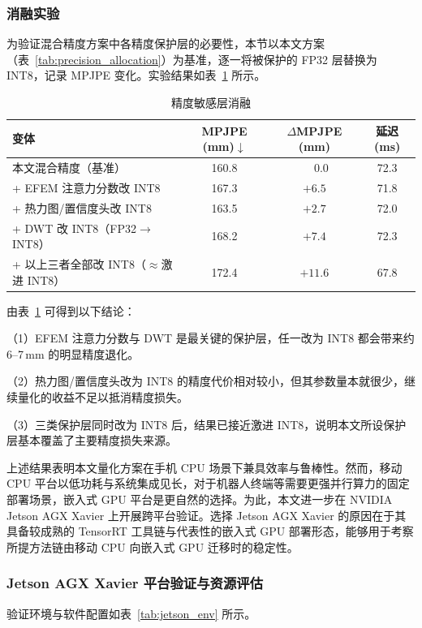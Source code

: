 \subsubsection{消融实验}

为验证混合精度方案中各精度保护层的必要性，本节以本文方案（表~\ref{tab:precision_allocation}）为基准，逐一将被保护的 FP32 层替换为 INT8，记录 MPJPE 变化。实验结果如表~\ref{tab:ablation_quant} 所示。

\begin{table}[htbp]
  \centering
  \small
\caption{精度敏感层消融}
  \label{tab:ablation_quant}
  \begin{tabular}{lccc}
    \toprule
    变体 & MPJPE (mm)$\downarrow$ & $\Delta$MPJPE (mm) & 延迟 (ms) \\
    \midrule
    本文混合精度（基准）                          & 160.8 & $\phantom{+}0.0$ & 72.3 \\
    \quad + EFEM 注意力分数改 INT8               & 167.3 & $+6.5$           & 71.8 \\
    \quad + 热力图/置信度头改 INT8               & 163.5 & $+2.7$           & 72.0 \\
    \quad + DWT 改 INT8（FP32$\to$INT8）        & 168.2 & $+7.4$           & 72.3 \\
    \quad + 以上三者全部改 INT8（$\approx$激进 INT8）& 172.4 & $+11.6$       & 67.8 \\
    \bottomrule
  \end{tabular}
\end{table}

由表~\ref{tab:ablation_quant} 可得到以下结论：

（1）EFEM 注意力分数与 DWT 是最关键的保护层，任一改为 INT8 都会带来约 6--7\,mm 的明显精度退化。

（2）热力图/置信度头改为 INT8 的精度代价相对较小，但其参数量本就很少，继续量化的收益不足以抵消精度损失。

（3）三类保护层同时改为 INT8 后，结果已接近激进 INT8，说明本文所设保护层基本覆盖了主要精度损失来源。

上述结果表明本文量化方案在手机 CPU 场景下兼具效率与鲁棒性。然而，移动 CPU 平台以低功耗与系统集成见长，对于机器人终端等需要更强并行算力的固定部署场景，嵌入式 GPU 平台是更自然的选择。为此，本文进一步在 NVIDIA Jetson AGX Xavier 上开展跨平台验证。选择 Jetson AGX Xavier 的原因在于其具备较成熟的 TensorRT 工具链与代表性的嵌入式 GPU 部署形态，能够用于考察所提方法链由移动 CPU 向嵌入式 GPU 迁移时的稳定性。

\subsubsection{Jetson AGX Xavier 平台验证与资源评估}
验证环境与软件配置如表~\ref{tab:jetson_env} 所示。

